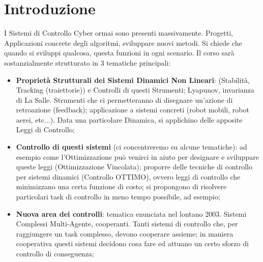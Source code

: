 
\chapter{Introduzione}
\label{cap:intro}

I Sistemi di Controllo Cyber ormai sono presenti massivamente. Progetti, Applicazioni concrete degli algoritmi, sviluppare nuovi metodi. Si chiede che quando si sviluppi qualcosa, questa funzioni in ogni scenario.
Il corso sarà sostanzialmente strutturato in 3 tematiche principali:

\begin{itemize}

\item \textbf{Proprietà Strutturali dei Sistemi Dinamici Non Lineari}: (Stabilità, Tracking (traiettorie)) e Controlli di questi Strumenti; Lyapunov, invarianza di La Salle. Strumenti che ci permetteranno di disegnare un'azione di retroazione (feedback); applicazione a sistemi concreti (robot mobili, robot aerei, etc...). Data una particolare Dinamica, si applichino delle apposite Leggi di Controllo;
\item \textbf{Controllo di questi sistemi} (ci concentreremo su alcune tematiche): ad esempio come l'Ottimizzazione può venirci in aiuto per designare e sviluppare queste leggi (Ottimizzazione Vincolata); proporre delle tecniche di controllo per sistemi dinamici (Controllo OTTIMO), ovvero leggi di controllo che minimizzano una certa funzione di costo; si propongono di risolvere particolari task di controllo in meno tempo possibile, ad esempio;
\item \textbf{Nuova area dei controlli}: tematica enunciata nel lontano 2003. Sistemi Complessi Multi-Agente, cooperanti. Tanti sistemi di controllo che, per raggiungere un task complesso, devono cooperare assieme; in maniera cooperativa questi sistemi decidono cosa fare ed attuano un certo sforzo di controllo di conseguenza;

\end{itemize}

